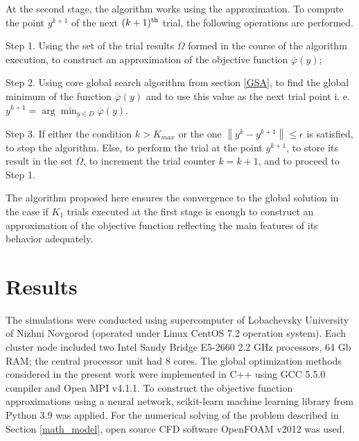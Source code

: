 \documentclass[sensors,article,submit,moreauthors,pdftex]{Definitions/mdpi}
\begin{document}
At the second stage, the algorithm works using the approximation. To compute the point $y^{k+1}$ of the next $(k+1)^{\rm th}$ trial, the following operations are performed.

Step 1. Using the set of the trial results $\Omega$ formed in the course of the algorithm execution, to construct an approximation of the objective function $\overline{\varphi}(y)$;

Step 2. Using core global search algorithm from section \ref{GSA}, to find the global minimum of the function $\overline{\varphi}(y)$ and to use this value as the next trial point i. e. $y^{k+1} = \arg \min_{y \in D} \overline{\varphi}(y)$.

Step 3. If either the condition $k>K_{max}$ or the one $\left\|y^k - y^{k+1}\right\| \leq \epsilon$ is satisfied, to stop the algorithm.
Else, to perform the trial at the point $y^{k+1}$, to store its result in the set $\Omega$, to increment the trial counter $k = k+1$, and to proceed to Step 1.

The algorithm proposed here ensures the convergence to the global solution in the case if $K_1$ trials executed at the first stage is enough to construct an approximation of the objective function reflecting the main features of its behavior adequately.




\section{Results}





The simulations were conducted using supercomputer of Lobachevsky University of Nizhni Novgorod (operated under Linux CentOS 7.2 operation system). Each cluster node included two  Intel Sandy Bridge E5-2660 2.2 GHz processors, 64 Gb RAM; the central processor unit had 8 cores. 
The global optimization methods considered in the present work were implemented in C++ using GCC 5.5.0 compiler and Open MPI v4.1.1. To construct the objective function approximations using a neural network, scikit-learn machine learning library from Python 3.9 was applied. 
For the numerical solving of the problem described in Section \ref{math_model}, open source CFD software OpenFOAM v2012 was used.
\end{document}
